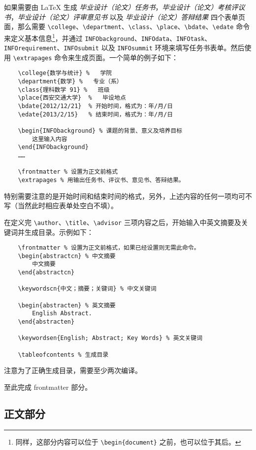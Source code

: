 \documentclass[%
               print, 
               timesmath
              ]{xjtubsc}
\begin{document}
如果需要由 \LaTeX{} 生成 \emph{毕业设计（论文）任务书}，\emph{毕业设计（论文）考核评议书}，\emph{毕业设计（论文）评审意见书} 以及 \emph{毕业设计（论文）答辩结果} 四个表单页面，那么需要 \verb|\college|、\verb|\department|、\verb|\class|、\verb|\place|、\verb|\bdate|、\verb|\edate| 命令来定义基本信息\footnote{同样，这部分内容可以位于 \verb+\begin{document}+ 之前，也可以位于其后。}，并通过 \verb|INFObackground|、\verb|INFOdata|、\verb|INFOtask|、\verb|INFOrequirement|、\verb|INFOsubmit| 以及 \verb|INFOsummit| 环境来填写任务书表单。然后使用 \verb|\extrapages| 命令来生成页面。一个简单的例子如下：
\begin{verbatim}
    \college{数学与统计}	%	学院
    \department{数学}	%	专业（系）
    \class{理科数学 91}	%	班级
    \place{西安交通大学}	%	毕设地点
    \bdate{2012/12/21}	% 开始时间，格式为：年/月/日
    \edate{2013/2/15}	% 结束时间，格式为：年/月/日
    
    \begin{INFObackground} % 课题的背景、意义及培养目标 
        这里输入内容
    \end{INFObackground}
    ……
    
    \frontmatter % 设置为正文前格式
    \extrapages % 用输出任务书、评议书、意见书、答辩结果。
\end{verbatim}
特别需要注意的是开始时间和结束时间的格式，另外，上述内容的任何一项均可不写（当然此时相应表单处空白不填）。

在定义完 \verb|\author|、\verb|\title|、\verb|\advisor| 三项内容之后，开始输入中英文摘要及关键词并生成目录。示例如下：
\begin{verbatim}
    \frontmatter % 设置为正文前格式，如果已经设置则无需此命令。
    \begin{abstractcn} % 中文摘要
        中文摘要
    \end{abstractcn}
    
    \keywordscn{中文；摘要；关键词} % 中文关键词
    
    \begin{abstracten} % 英文摘要
        English Abstract.
    \end{abstracten}
    
    \keywordsen{English; Abstract; Key Words} % 英文关键词
    
    \tableofcontents % 生成目录
\end{verbatim}
注意为了正确生成目录，需要至少两次编译。

至此完成 frontmatter 部分。

\subsection{正文部分}
\end{document}
